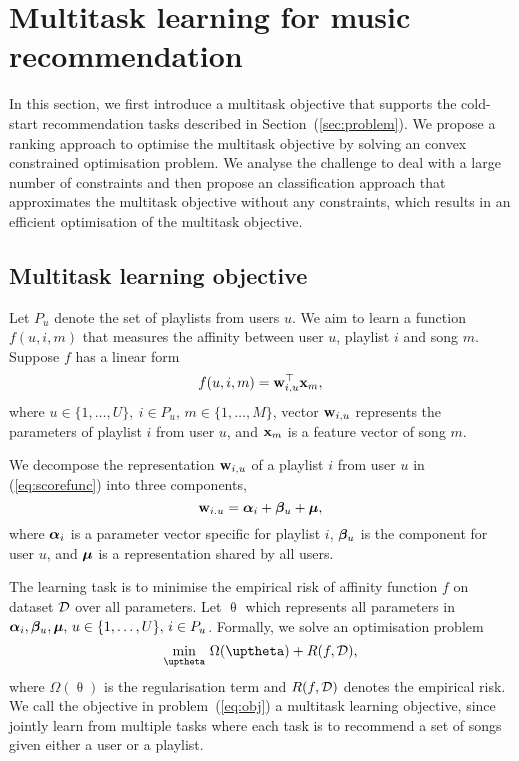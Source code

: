 \section{Multitask learning for music recommendation}
\label{sec:method}

In this section, we first introduce a multitask objective that supports the cold-start recommendation tasks
described in Section~(\ref{sec:problem}). We propose a ranking approach to optimise the multitask objective 
by solving an convex constrained optimisation problem.
We analyse the challenge to deal with a large number of constraints and then propose an classification approach
that approximates the multitask objective without any constraints, which results in an efficient optimisation of
the multitask objective.


\subsection{Multitask learning objective}

Let $P_u$ denote the set of playlists from users $u$.
We aim to learn a function $f(u, i, m)$ that measures the affinity between user $u$, 
playlist $i$ and song $m$. Suppose $f$ has a linear form
\begin{equation}
\label{eq:scorefunc}
f(u, i, m) = \mathbf{w}_{i,u}^\top \mathbf{x}_m,
\end{equation}
where $u \in \{1,\dots,U\}, \ i \in P_u, \, m \in \{1,\dots,M\}$,
vector $\mathbf{w}_{i,u}$ represents the parameters of playlist $i$ from user $u$,
and $\mathbf{x}_m$ is a feature vector of song $m$.

We decompose the representation $\mathbf{w}_{i,u}$ of a playlist $i$ from user $u$ in (\ref{eq:scorefunc}) into three components, \ie
$$
\mathbf{w}_{i.u} = {\bm{\alpha}}_i + {\bm{\beta}}_u + \bm{\mu},
$$
where ${\bm{\alpha}}_i$ is a parameter vector specific for playlist $i$,
${\bm{\beta}}_u$ is the component for user $u$,
and $\bm{\mu}$ is a representation shared by all users.

The learning task is to minimise the empirical risk of affinity function $f$ on dataset $\mathcal{D}$ over all parameters.
Let $\uptheta$ which represents all parameters in ${\bm{\alpha}}_i, {\bm{\beta}}_u, \bm{\mu}, \, u \in \{1,\dots,U\}, \, i \in P_u$.
Formally, we solve an optimisation problem
\begin{equation}
\label{eq:obj}
\min_{\uptheta} \, \Omega(\uptheta) + R(f, \DCal),
\end{equation}
where $\Omega(\uptheta)$ is the regularisation term and $R(f, \mathcal{D})$ denotes the empirical risk.
We call the objective in problem~(\ref{eq:obj}) a multitask learning objective,
since jointly learn from multiple tasks where each task is to recommend a set of songs given either a user or a playlist.

